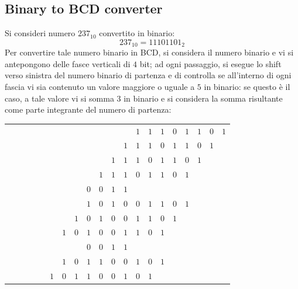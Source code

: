 \documentclass[a4paper]{extarticle}
\renewcommand\arraystretch{}
\begin{document}
\vspace{1em}
\noindent
\subsection{Binary to BCD converter}
Si consideri numero $237_{10}$ convertito in binario:
\[237_{10} = 11101101_2\]
Per convertire tale numero binario in BCD, si considera il numero binario e vi si antepongono delle fasce verticali di $4$ bit; ad ogni passaggio, si esegue lo shift verso sinistra del numero binario di partenza e di controlla se all'interno di ogni fascia vi sia contenuto un valore maggiore o uguale a $5$ in binario: se questo è il caso, a tale valore vi si somma $3$ in binario e si considera la somma risultante come parte integrante del numero di partenza:

\noindent
\begin{table}[H]
\setlength{\tabcolsep}{4pt}
\renewcommand{\arraystretch}{1.2}
\centering
\begin{tabular}{|cccc|cccc|cccc|cccccccc}
    &&&&&&&&&&&&$1$&$1$&$1$&$0$&$1$&$1$&$0$&$1$\\
    &&&&&&&&&&&$1$&$1$&$1$&$0$&$1$&$1$&$0$&$1$&\\
    &&&&&&&&&&$1$&$1$&$1$&$0$&$1$&$1$&$0$&$1$&&\\
    &&&&&&&&\cellcolor{cyan!25!white}$ $&\cellcolor{cyan!25!white}$1$&\cellcolor{cyan!25!white}$1$&\cellcolor{cyan!25!white}$1$&$0$&$1$&$1$&$0$&$1$&&&\\
    &&&&&&&&\cellcolor{cyan!25!white}$0$&\cellcolor{cyan!25!white}$0$&\cellcolor{cyan!25!white}$1$&\cellcolor{cyan!25!white}$1$&$ $&$ $&$ $&$ $&$ $&&&\\
    &&&&&&&&$1$&$0$&$1$&$0$&$0$&$1$&$1$&$0$&$1$&&&\\
    &&&&&&&$1$&$0$&$1$&$0$&$0$&$1$&$1$&$0$&$1$&&&&\\
    &&&&&&$1$&$0$&\cellcolor{cyan!25!white}$1$&\cellcolor{cyan!25!white}$0$&\cellcolor{cyan!25!white}$0$&\cellcolor{cyan!25!white}$1$&$1$&$0$&$1$&&&&&\\
    &&&&&&&&\cellcolor{cyan!25!white}$0$&\cellcolor{cyan!25!white}$0$&\cellcolor{cyan!25!white}$1$&\cellcolor{cyan!25!white}$1$&$ $&$ $&$ $&$ $&$ $&&&\\
    &&&&&&$1$&$0$&$1$&$1$&$0$&$0$&$1$&$0$&$1$&&&&&\\
    &&&&\cellcolor{cyan!25!white}&\cellcolor{cyan!25!white}$1$&\cellcolor{cyan!25!white}$0$&\cellcolor{cyan!25!white}$1$&\cellcolor{cyan!25!white}$1$&\cellcolor{cyan!25!white}$0$&\cellcolor{cyan!25!white}$0$&\cellcolor{cyan!25!white}$1$&$0$&$1$&&&&&&\\

\end{tabular}
\end{table}
\end{document}
